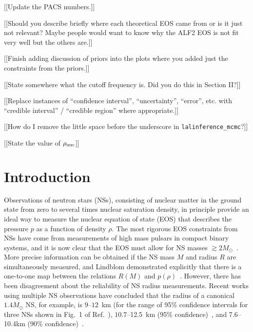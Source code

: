 \documentclass[twocolumn,prd,amssymb,aps,nofootinbib,showpacs,epsf]{revtex4}
\begin{document}
[[Update the PACS numbers.]]

[[Should you describe briefly where each theoretical EOS came from or is it just not relevant? Maybe people would want to know why the ALF2 EOS is not fit very well but the others are.]]

[[Finish adding discussion of priors into the plots where you added just the constraints from the priors.]]

[[State somewhere what the cutoff frequency is. Did you do this in Section II?]]

[[Replace instances of ``confidence interval'', ``uncertainty'', ``error'', etc. with ``credible interval'' / ``credible region'' where appropriate.]]

[[How do I remove the little space before the underscore in \texttt{lalinference\_mcmc}?]]

[[State the value of $\rho_{\rm nuc}$]]

\section{Introduction}

Observations of neutron stars (NSs), consisting of nuclear matter in the ground state from zero to several times nuclear saturation density, in principle provide an ideal way to measure the nuclear equation of state (EOS) that describes the pressure $p$ as a function of density $\rho$. The most rigorous EOS constraints from NSs have come from measurements of high mass pulsars in compact binary systems, and it is now clear that the EOS must allow for NS masses $\gtrsim 2 M_\odot$~\cite{DemorestPennucciRansom2010, AntoniadisFreireWex2013}. More precise information can be obtained if the NS mass $M$ and radius $R$ are simultaneously measured, and Lindblom demonstrated explicitly that there is a one-to-one map between the relations $R(M)$ and $p(\rho)$~\cite{Lindblom1992}. However, there has been disagreement about the reliability of NS radius measurements. Recent works using multiple NS observations have concluded that the radius of a canonical $1.4M_\odot$ NS, for example, is $9$--$12$~km (for the range of 95\% confidence intervals for three NSs shown in Fig.~1 of Ref.~\cite{OzelBaymGuver2010}), $10.7$--12.5~km (95\% confidence)~\cite{SteinerLattimerBrown2010}, and 7.6--10.4km (90\% confidence)~\cite{GuillotServillatWebb2013}.
\end{document}
